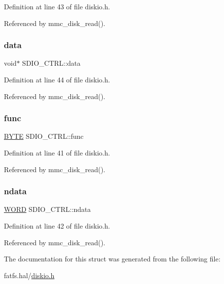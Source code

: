 Definition at line 43 of file diskio.\+h.



Referenced by mmc\+\_\+disk\+\_\+read().

\mbox{\label{structSDIO__CTRL_ab04c9adb4d3027a14925fb30b469f0c0}} 
\subsubsection{\texorpdfstring{data}{data}}
{\footnotesize\ttfamily void$\ast$ S\+D\+I\+O\+\_\+\+C\+T\+R\+L\+::data}



Definition at line 44 of file diskio.\+h.



Referenced by mmc\+\_\+disk\+\_\+read().

\mbox{\label{structSDIO__CTRL_a2f0a17848a6c7c58f826d1888469e6e3}} 
\subsubsection{\texorpdfstring{func}{func}}
{\footnotesize\ttfamily \hyperlink{ff_8h_a4ae1dab0fb4b072a66584546209e7d58}{B\+Y\+TE} S\+D\+I\+O\+\_\+\+C\+T\+R\+L\+::func}



Definition at line 41 of file diskio.\+h.



Referenced by mmc\+\_\+disk\+\_\+read().

\mbox{\label{structSDIO__CTRL_a44edc7d37688ac4f3a1ba3d66e909767}} 
\subsubsection{\texorpdfstring{ndata}{ndata}}
{\footnotesize\ttfamily \hyperlink{ff_8h_a197942eefa7db30960ae396d68339b97}{W\+O\+RD} S\+D\+I\+O\+\_\+\+C\+T\+R\+L\+::ndata}



Definition at line 42 of file diskio.\+h.



Referenced by mmc\+\_\+disk\+\_\+read().



The documentation for this struct was generated from the following file\+:\begin{DoxyCompactItemize}
\item 
fatfs.\+hal/\hyperlink{diskio_8h}{diskio.\+h}\end{DoxyCompactItemize}
